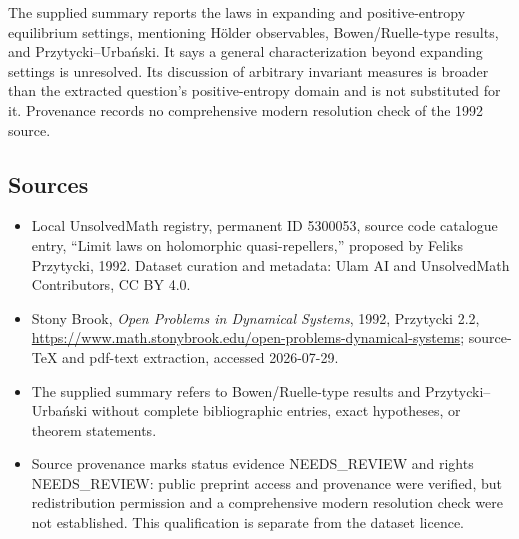\documentclass[11pt]{article}
\begin{document}
The supplied summary reports the laws in expanding and positive-entropy equilibrium settings, mentioning Hölder observables, Bowen/Ruelle-type results, and Przytycki--Urbański. It says a general characterization beyond expanding settings is unresolved. Its discussion of arbitrary invariant measures is broader than the extracted question's positive-entropy domain and is not substituted for it. Provenance records no comprehensive modern resolution check of the 1992 source.
\subsection{Sources}
\begin{itemize}
\item Local UnsolvedMath registry, permanent ID 5300053, source code catalogue entry, ``Limit laws on holomorphic quasi-repellers,'' proposed by Feliks Przytycki, 1992. Dataset curation and metadata: Ulam AI and UnsolvedMath Contributors, CC BY 4.0.
\item Stony Brook, \emph{Open Problems in Dynamical Systems}, 1992, Przytycki 2.2, \url{https://www.math.stonybrook.edu/open-problems-dynamical-systems}; source-TeX and pdf-text extraction, accessed 2026-07-29.
\item The supplied summary refers to Bowen/Ruelle-type results and Przytycki--Urbański without complete bibliographic entries, exact hypotheses, or theorem statements.
\item Source provenance marks status evidence NEEDS\_REVIEW and rights NEEDS\_REVIEW: public preprint access and provenance were verified, but redistribution permission and a comprehensive modern resolution check were not established. This qualification is separate from the dataset licence.
\end{itemize}
\end{document}
